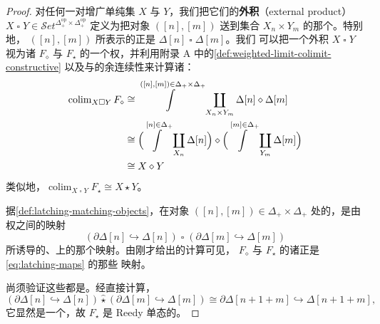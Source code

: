 \begin{proof}
对任何一对增广单纯集 $X$ 与 $Y$，我们把它们的\textbf{外积}（external
product）$X\mathbin{\square}Y\in\mathcal{S}et^{\Delta_{+}^{\mathrm{op}}\times\Delta_{+}^{\mathrm{op}}}$
定义为把对象 $([n],[m])$ 送到集合 $X_{n}\times Y_{m}$ 的那个\trFunctor。特别地，
$([n],[m])$ 所表示的\trFunctor{}正是 $\Delta[n]\mathbin{\square}\Delta[m]$。我们
可以把一个外积 $X\mathbin{\square}Y$ 视为诸\trDiagram{} $F_{\diamond}$ 与
$F_{\star}$ 的一个权，并利用附录 A 中的\cref{def:weighted-limit-colimit-constructive}
以及\trJoin{}与\trFatJoin\trBifunctor{}的余连续性来计算诸\trWeightedColimit：
\begin{align*}
\operatorname{colim}_{X\mathbin{\square}Y}F_{\diamond}
&\cong\int\limits^{([n],[m])\in\Delta_{+}\times\Delta_{+}}
  \coprod_{X_{n}\times Y_{m}}\Delta[n]\diamond\Delta[m]\\
&\cong\Bigl(\int\limits^{[n]\in\Delta_{+}}\coprod_{X_{n}}\Delta[n]\Bigr)\diamond
  \Bigl(\int\limits^{[m]\in\Delta_{+}}\coprod_{Y_{m}}\Delta[m]\Bigr)\\
&\cong X\diamond Y
\end{align*}
类似地，$\operatorname{colim}_{X\mathbin{\square}Y}F_{\star}\cong X\star Y$。

据\cref{def:latching-matching-objects}，在对象 $([n],[m])\in\Delta_{+}\times\Delta_{+}$
处的\trLatchingMap，是由权之间的映射
\begin{equation*}
(\partial\Delta[n]\hookrightarrow\Delta[n])\mathbin{\square}
(\partial\Delta[m]\hookrightarrow\Delta[m])
\end{equation*}
所诱导的、\trWeightedColimit{}上的那个映射。由刚才给出的\trWeightedColimit{}计算可见，%
$F_{\diamond}$ 与 $F_{\star}$ 的诸\trLatchingMap{}正是 \eqref{eq:latching-maps} 的那些
映射。

尚须验证这些\trLatchingMap{}都是\trMonomorphism。经直接计算，
\begin{equation*}
(\partial\Delta[n]\hookrightarrow\Delta[n])\mathbin{\hat{\star}}
(\partial\Delta[m]\hookrightarrow\Delta[m])
\cong\partial\Delta[n+1+m]\hookrightarrow\Delta[n+1+m]\mbox{,}
\end{equation*}
它显然是一个\trMonomorphism，故 $F_{\star}$ 是 Reedy 单态的。


\end{proof}

